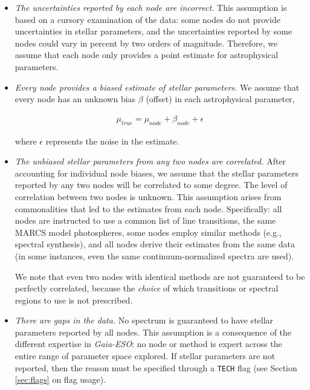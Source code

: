\documentclass[preprint]{aastex}
\newcommand{\project}[1]{\textsl{#1}}
\newcommand{\gaiaeso}{\project{Gaia-ESO}}
\begin{document}
\begin{itemize}
    \item   \emph{The uncertainties reported by each node are incorrect.}
            This assumption is based on a cursory examination of the data:
            some nodes do not provide uncertainties in stellar parameters, and
            the uncertainties reported by some nodes could vary in percent by
            two orders of magnitude. Therefore, we assume that each node only
            provides a point estimate for astrophysical parameters.

    \item   \emph{Every node provides a biased estimate of stellar parameters.}
            We assume that every node has an unknown bias $\beta$ (offset) in each
            astrophysical parameter, 

            \begin{eqnarray}
                \mu_{true} = \mu_{node} + \beta_{node} + \epsilon
            \end{eqnarray}

            \noindent{}where $\epsilon$ represents the noise in the estimate.

    \item   \emph{The unbiased stellar parameters from any two nodes are correlated.}
            After accounting for individual node biases, we assume that the 
            stellar parameters reported by any two nodes will be correlated
            to some degree. The level of correlation between two nodes is unknown.
            This assumption arises from commonalities that led to the estimates from
            each node. Specifically: all nodes are instructed to use a common list 
            of line transitions, the same MARCS model photospheres, some nodes employ
            similar methods (e.g., spectral synthesis), and all nodes derive their 
            estimates from the same data (in some instances, even the same 
            continuum-normalized spectra are used).

            We note that even two nodes with identical methods are not guaranteed
            to be perfectly correlated, because the \emph{choice} of which transitions
            or spectral regions to use is not prescribed.

    \item   \emph{There are gaps in the data.} 
            No spectrum is guaranteed to have stellar parameters reported by all
            nodes. This assumption is a consequence of the different expertise in
            \gaiaeso: no node or method is expert across the entire range of parameter
            space explored. If stellar parameters are not reported, then the reason 
            must be specified through a \texttt{TECH} flag (see Section \ref{sec:flags}
            on flag usage).


\end{itemize}
\end{document}

